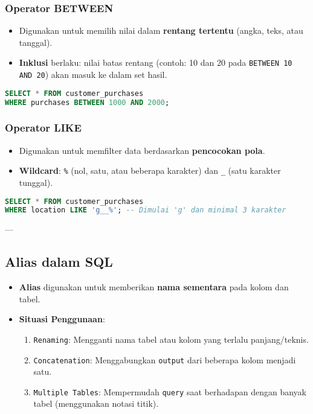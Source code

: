 \documentclass{article}
\begin{document}
\subsubsection{Operator BETWEEN}
\begin{itemize}
    \item Digunakan untuk memilih nilai dalam \textbf{rentang tertentu} (angka, teks, atau tanggal).
    \item \textbf{Inklusi} berlaku: nilai batas rentang (contoh: 10 dan 20 pada \texttt{BETWEEN 10 AND 20}) akan masuk ke dalam set hasil.
\end{itemize}
\begin{lstlisting}[language=SQL, caption={Contoh Penggunaan BETWEEN}, captionpos=b]
SELECT * FROM customer_purchases
WHERE purchases BETWEEN 1000 AND 2000;
\end{lstlisting}

\subsubsection{Operator LIKE}
\begin{itemize}
    \item Digunakan untuk memfilter data berdasarkan \textbf{pencocokan pola}.
    \item \textbf{Wildcard}: \texttt{\%} (nol, satu, atau beberapa karakter) dan \texttt{\_} (satu karakter tunggal).
\end{itemize}
\begin{lstlisting}[language=SQL, caption={Contoh Penggunaan LIKE}, captionpos=b]
SELECT * FROM customer_purchases
WHERE location LIKE 'g__%'; -- Dimulai 'g' dan minimal 3 karakter
\end{lstlisting}

---

\subsection{Alias dalam SQL}
\begin{itemize}
    \item \textbf{Alias} digunakan untuk memberikan \textbf{nama sementara} pada kolom dan tabel.
    \item \textbf{Situasi Penggunaan}:
          \begin{enumerate}
              \item \texttt{Renaming}: Mengganti nama tabel atau kolom yang terlalu panjang/teknis.
              \item \texttt{Concatenation}: Menggabungkan \texttt{output} dari beberapa kolom menjadi satu.
              \item \texttt{Multiple Tables}: Mempermudah \texttt{query} saat berhadapan dengan banyak tabel (menggunakan notasi titik).
          \end{enumerate}
\end{itemize}
\end{document}
